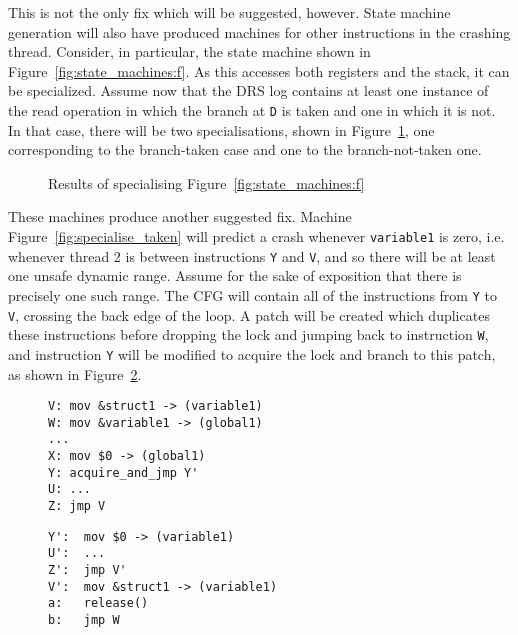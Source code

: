 \documentclass[10pt,letter,twocolumn]{sigplanconf}
\makeatletter
\newenvironment{subfloat}%
    {\def\caption##1{\gdef\subcapsave{\relax##1}}%
     \let\subcapsave=\@empty %
     \let\sf@oldlabel=\label
     \def\label##1{\xdef\sublabsave{\noexpand\label{##1}}}%
     \let\sublabsave\relax    %
     \setbox\subfigbox\hbox
       \bgroup}%
      {\egroup                %
     \let\label=\sf@oldlabel
     \subfigure[\subcapsave]{\box\subfigbox}}%
\makeatother
\begin{document}
This is not the only fix which will be suggested, however.  State
machine generation will also have produced machines for other
instructions in the crashing thread.  Consider, in particular, the
state machine shown in Figure~\ref{fig:state_machines:f}.  As this
accesses both registers and the stack, it can be specialized.  Assume
now that the DRS log contains at least one instance of the read
operation in which the branch at \verb|D| is taken and one in which it
is not.  In that case, there will be two specialisations, shown in
Figure~\ref{fig:example_specialisations}, one corresponding to the
branch-taken case and one to the branch-not-taken one.

\begin{figure}[thb]
\caption{Results of specialising Figure~\ref{fig:state_machines:f}}
\label{fig:example_specialisations}
\end{figure}

These machines produce another suggested fix.  Machine
Figure~\ref{fig:specialise_taken} will predict a crash whenever
\verb|variable1| is zero, i.e. whenever thread 2 is between
instructions \verb|Y| and \verb|V|, and so there will be at least one
unsafe dynamic range.  Assume for the sake of exposition that there is
precisely one such range.  The CFG will contain all of the
instructions from \verb|Y| to \verb|V|, crossing the back edge of the
loop.  A patch will be created which duplicates these instructions
before dropping the lock and jumping back to instruction \verb|W|, and
instruction \verb|Y| will be modified to acquire the lock and branch
to this patch, as shown in Figure~\ref{fig:patch1}.

\begin{figure}
  \begin{subfloat}
    \begin{minipage}{60mm}
\begin{verbatim}
V: mov &struct1 -> (variable1)
W: mov &variable1 -> (global1)
...
X: mov $0 -> (global1)
Y: acquire_and_jmp Y'
U: ...
Z: jmp V
\end{verbatim}
    \end{minipage}
  \end{subfloat}
  \begin{subfloat}
    \begin{minipage}{50mm}
\begin{verbatim}
Y':  mov $0 -> (variable1)
U':  ...
Z':  jmp V'
V':  mov &struct1 -> (variable1)
a:   release()
b:   jmp W
\end{verbatim}
    \end{minipage}
  \end{subfloat}
  \caption{Partial patch based on the state machine in figure~\ref{fig:specialise_taken}.}
  \label{fig:patch1}
\end{figure}
\end{document}
